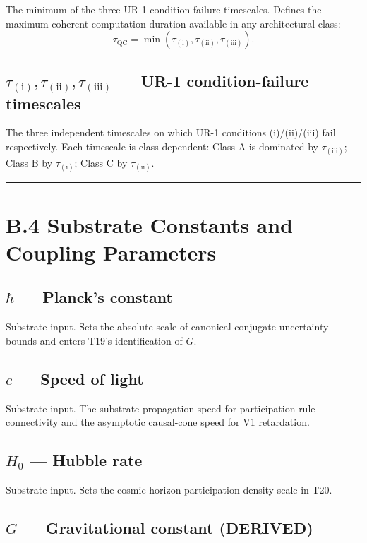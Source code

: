 \documentclass[11pt]{book}
\begin{document}
The minimum of the three UR-1 condition-failure timescales. Defines the maximum coherent-computation duration available in any architectural class:
\[
\tau_\mathrm{QC} = \min(\tau_{(\mathrm{i})}, \tau_{(\mathrm{ii})}, \tau_{(\mathrm{iii})}).
\]

\subsection{$\tau_{(\mathrm{i})}, \tau_{(\mathrm{ii})}, \tau_{(\mathrm{iii})}$ — UR-1 condition-failure timescales}

The three independent timescales on which UR-1 conditions (i)/(ii)/(iii) fail respectively. Each timescale is class-dependent: Class A is dominated by $\tau_{(\mathrm{iii})}$; Class B by $\tau_{(\mathrm{i})}$; Class C by $\tau_{(\mathrm{ii})}$.

\bigskip\hrule\bigskip

\section{B.4 Substrate Constants and Coupling Parameters}

\subsection{$\hbar$ — Planck's constant}

Substrate input. Sets the absolute scale of canonical-conjugate uncertainty bounds and enters T19's identification of $G$.

\subsection{$c$ — Speed of light}

Substrate input. The substrate-propagation speed for participation-rule connectivity and the asymptotic causal-cone speed for V1 retardation.

\subsection{$H_0$ — Hubble rate}

Substrate input. Sets the cosmic-horizon participation density scale in T20.

\subsection{$G$ — Gravitational constant (DERIVED)}
\end{document}
